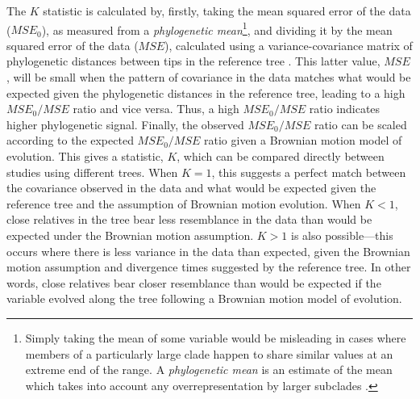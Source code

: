 The \(K\) statistic is calculated by, firstly, taking the mean squared error of the data (\(MSE_0\)), as measured from a \emph{phylogenetic mean}\footnote{Simply taking the mean of some variable would be misleading in cases where members of a particularly large clade happen to share similar values at an extreme end of the range. A \emph{phylogenetic mean} is an estimate of the mean which takes into account any overrepresentation by larger subclades \autocite[see, for example,][]{garland_jr._polytomies_1999}.}, and dividing it by the mean squared error of the data (\(MSE\)), calculated using a variance-covariance matrix of phylogenetic distances between tips in the reference tree \autocite[see][]{blomberg_testing_2003}. This latter value, \(MSE\), will be small when the pattern of covariance in the data matches what would be expected given the phylogenetic distances in the reference tree, leading to a high \(MSE_0/MSE\) ratio and vice versa. Thus, a high \(MSE_0/MSE\) ratio indicates higher phylogenetic signal. Finally, the observed \(MSE_0/MSE\) ratio can be scaled according to the expected \(MSE_0/MSE\) ratio given a Brownian motion model of evolution. This gives a statistic, \(K\), which can be compared directly between studies using different trees. When \(K = 1\), this suggests a perfect match between the covariance observed in the data and what would be expected given the reference tree and the assumption of Brownian motion evolution. When \(K < 1\), close relatives in the tree bear less resemblance in the data than would be expected under the Brownian motion assumption. \(K > 1\) is also possible---this occurs where there is less variance in the data than expected, given the Brownian motion assumption and divergence times suggested by the reference tree. In other words, close relatives bear closer resemblance than would be expected if the variable evolved along the tree following a Brownian motion model of evolution.

